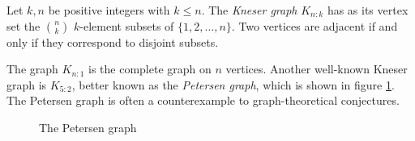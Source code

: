 \documentclass[12pt]{article}
\begin{document}
Let $k,n$ be positive integers with $k\leq n$. The \emph{Kneser graph} $K_{n:k}$ has as its vertex set the $n\choose k$ $k$-element subsets of $\{1,2,\dots,n\}$. Two vertices are adjacent if and only if they correspond to disjoint subsets.

The graph $K_{n:1}$ is the complete graph on $n$ vertices. Another well-known Kneser graph is $K_{5:2}$, better known as the \emph{Petersen graph}, which is shown in figure \ref{petersen}. The Petersen graph is often a counterexample to graph-theoretical conjectures.

\begin{figure}
\centering
{}
\caption{\label{petersen}The Petersen graph}
\end{figure}
\end{document}
